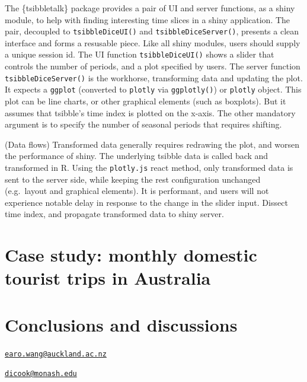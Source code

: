 The \{tsibbletalk\} package provides a pair of UI and server functions,
as a shiny module, to help with finding interesting time slices in a
shiny application. The pair, decoupled to \texttt{tsibbleDiceUI()} and
\texttt{tsibbleDiceServer()}, presents a clean interface and forms a
resusable piece. Like all shiny modules, users should supply a unique
session id. The UI function \texttt{tsibbleDiceUI()} shows a slider that
controls the number of periods, and a plot specified by users. The
server function \texttt{tsibbleDiceServer()} is the workhorse,
transforming data and updating the plot. It expects a \texttt{ggplot}
(converted to \texttt{plotly} via \texttt{ggplotly()}) or
\texttt{plotly} object. This plot can be line charts, or other graphical
elements (such as boxplots). But it assumes that tsibble's time index is
plotted on the x-axis. The other mandatory argument is to specify the
number of seasonal periods that requires shifting.

(Data flows) Transformed data generally requires redrawing the plot, and
worsen the performance of shiny. The underlying tsibble data is called
back and transformed in R. Using the \texttt{plotly.js} react method,
only transformed data is sent to the server side, while keeping the rest
configuration unchanged (e.g.~layout and graphical elements). It is
performant, and users will not experience notable delay in response to
the change in the slider input. Dissect time index, and propagate
transformed data to shiny server.

\hypertarget{case-study-monthly-domestic-tourist-trips-in-australia}{%
\section{Case study: monthly domestic tourist trips in
Australia}\label{case-study-monthly-domestic-tourist-trips-in-australia}}

\hypertarget{conclusions-and-discussions}{%
\section{Conclusions and
discussions}\label{conclusions-and-discussions}}



\address{%
Earo Wang\\
The University of Auckland\\
Department of Statistics\\ The Univerisity of Auckland\\ New Zealand\\
}
\href{mailto:earo.wang@auckland.ac.nz}{\nolinkurl{earo.wang@auckland.ac.nz}}

\address{%
Dianne Cook\\
Monash University\\
Department of Econometrics and Business Statistics\\ Monash University\\ Australia\\
}
\href{mailto:dicook@monash.edu}{\nolinkurl{dicook@monash.edu}}

